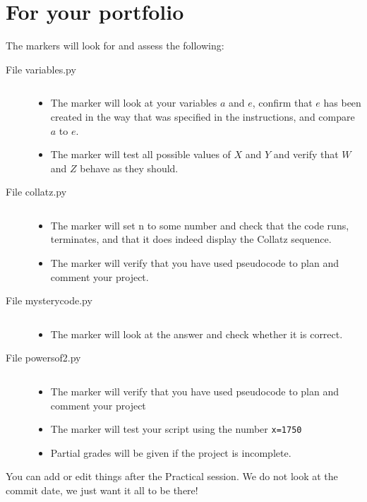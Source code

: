 \documentclass[pdflatex,a4paper]{article}
\begin{document}
\section{For your portfolio}

The markers will look for and assess the following:

\begin{description}
\item[File variables.py] $\;$\\
\begin{itemize}
\item
The marker will look at your variables \(a\) and \(e\),  confirm that \(e\) has been created in the way that was specified in the instructions, and compare \(a\) to \(e\).
\item
The marker will test all possible values of \(X\) and \(Y\) and verify that \(W\) and \(Z\) behave as they should.
\end{itemize}

\item[File collatz.py] $\;$\\

\begin{itemize}
\item
The marker will set n to some number and check that the code runs, terminates, and that it does indeed display the Collatz sequence. 
\item
The marker will verify that you have used pseudocode to plan and comment your project. 
\end{itemize}


\item[File mysterycode.py] $\;$\\

\begin{itemize}
\item
The marker will look at the answer and check whether it is correct.
\end{itemize}



\item[File powersof2.py] $\;$\\

\begin{itemize}
\item
The marker will verify that you have used pseudocode to plan and comment your project
\item
The marker will test your script using the number \verb_x=1750_  
\item
Partial grades will be given if the project is incomplete.
\end{itemize}


\end{description}



You can add or edit things after the Practical session. We do not look at the commit date, we just want it all to be there!
\end{document}
